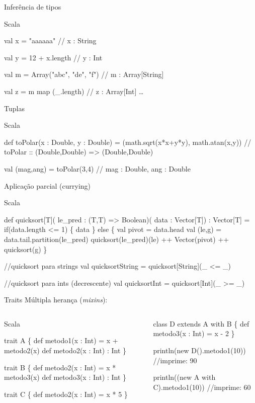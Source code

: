 \documentclass[12pt]{beamer}
\newenvironment{scala}{
\begin{block}{Scala} \begin{semiverbatim}
}{
\end{semiverbatim} \end{block}
}
\begin{document}
\begin{frame}[fragile]{Inferência de tipos}
\begin{scala}
val x = "aaaaaa" // x : String

val y = 12 +  x.length // y : Int

val m = Array("abc", "de", "f") 
// m : Array[String]

val z = m map (_.length) // z : Array[Int]
\dots
\end{scala}
\end{frame}

\begin{frame}[fragile]{Tuplas}
\begin{scala}
def toPolar(x : Double, y : Double) = 
  (math.sqrt(x*x+y*y), math.atan(x,y))
// toPolar :: (Double,Double) => (Double,Double)

val (mag,ang) = toPolar(3,4)
// mag : Double, ang : Double
\end{scala}
\end{frame}

\begin{frame}[fragile]{Aplicação parcial (currying)}
\scriptsize
\begin{scala}
def quicksort[T](
      le_pred : (T,T) => Boolean)(
      data : Vector[T]) : Vector[T] =
  if(data.length <= 1) 
   \{ data \} else \{
      val pivot = data.head
      val (le,g) = 
        data.tail.partition(le_pred)
      quicksort(le_pred)(le) ++ 
        Vector(pivot) ++ 
        quicksort(g)
  \}

//quicksort para strings
val quicksortString = 
  quicksort[String](_ <= _)

//quicksort para ints (decrescente)
val quicksortInt = 
  quicksort[Int](_ >= _)
\end{scala}
\end{frame}

\begin{frame}[fragile]{Traits}
Múltipla herança (\emph{mixins}):
\begin{columns}[t]
\scriptsize
\column{5.5cm}
\begin{scala}
trait A \{
  def metodo1(x : Int) =
    x + metodo2(x)
  def metodo2(x : Int) : Int
\}

trait B \{
  def metodo2(x : Int) = 
    x * metodo3(x)
  def metodo3(x : Int) : Int
\}

trait C \{
  def metodo2(x : Int) = x * 5
\}
\end{scala}

\column{6cm}
\begin{block}{}
\begin{semiverbatim}
class D extends A with B \{
  def metodo3(x : Int) = x - 2
\}

println(new D().metodo1(10)) 
//imprime: 90

println((new A with C).metodo1(10)) 
//imprime: 60
\end{semiverbatim}
\end{block}
\end{columns}
\end{frame}
\end{document}
